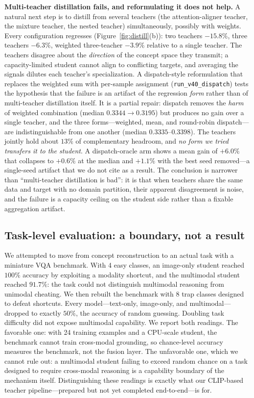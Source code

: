 \documentclass[10pt,twoside]{article}
\theoremstyle{definition}
\theoremstyle{plain}
\theoremstyle{remark}
\begin{document}
\textbf{Multi-teacher distillation fails, and reformulating it does not help.} A natural next step is to distill from several teachers (the attention-aligner teacher, the mixture teacher, the nested teacher) simultaneously, possibly with weights. Every configuration regresses (Figure~\ref{fig:distill}(b)): two teachers $-15.8\%$, three teachers $-6.3\%$, weighted three-teacher $-3.9\%$ relative to a single teacher. The teachers disagree about the \emph{direction} of the concept space they transmit; a capacity-limited student cannot align to conflicting targets, and averaging the signals dilutes each teacher's specialization. A dispatch-style reformulation that replaces the weighted sum with per-sample assignment (\texttt{run\_v40\_dispatch}) tests the hypothesis that the failure is an artifact of the regression \emph{form} rather than of multi-teacher distillation itself. It is a partial repair: dispatch removes the \emph{harm} of weighted combination (median $0.3344 \rightarrow 0.3195$) but produces no gain over a single teacher, and the three forms---weighted, mean, and round-robin dispatch---are indistinguishable from one another (median $0.3335$--$0.3398$). The teachers jointly hold about $13\%$ of complementary headroom, and \emph{no form we tried transfers it to the student}. A dispatch-oracle arm shows a mean gain of $+6.0\%$ that collapses to $+0.6\%$ at the median and $+1.1\%$ with the best seed removed---a single-seed artifact that we do not cite as a result. The conclusion is narrower than ``multi-teacher distillation is bad'': it is that when teachers share the same data and target with no domain partition, their apparent disagreement is noise, and the failure is a capacity ceiling on the student side rather than a fixable aggregation artifact.

\subsection{Task-level evaluation: a boundary, not a result}
\label{sec:vqa-exp}

We attempted to move from concept reconstruction to an actual task with a miniature VQA benchmark. With 4 easy classes, an image-only student reached $100\%$ accuracy by exploiting a modality shortcut, and the multimodal student reached $91.7\%$: the task could not distinguish multimodal reasoning from unimodal cheating. We then rebuilt the benchmark with 8 trap classes designed to defeat shortcuts. Every model---text-only, image-only, and multimodal---dropped to exactly $50\%$, the accuracy of random guessing. Doubling task difficulty did not expose multimodal capability. We report both readings. The favorable one: with 24 training examples and a CPU-scale student, the benchmark cannot train cross-modal grounding, so chance-level accuracy measures the benchmark, not the fusion layer. The unfavorable one, which we cannot rule out: a multimodal student failing to exceed random chance on a task designed to require cross-modal reasoning is a capability boundary of the mechanism itself. Distinguishing these readings is exactly what our CLIP-based \citep{radford2021} teacher pipeline---prepared but not yet completed end-to-end---is for.
\end{document}
